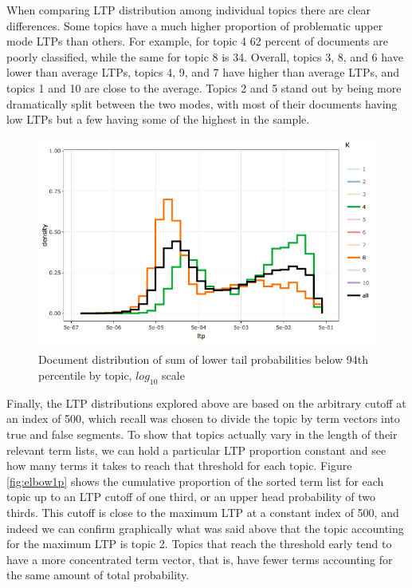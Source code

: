 \documentclass[]{book}
\theoremstyle{definition}
\theoremstyle{definition}
\theoremstyle{definition}
\theoremstyle{remark}
\begin{document}
When comparing LTP distribution among individual topics there are clear
differences. Some topics have a much higher proportion of problematic
upper mode LTPs than others. For example, for topic 4 62 percent of
documents are poorly classified, while the same for topic 8 is 34.
Overall, topics 3, 8, and 6 have lower than average LTPs, topics 4, 9,
and 7 have higher than average LTPs, and topics 1 and 10 are close to
the average. Topics 2 and 5 stand out by being more dramatically split
between the two modes, with most of their documents having low LTPs but
a few having some of the highest in the sample.

\begin{figure}

{\centering \includegraphics[width=0.9\linewidth]{img/k10headtail} 

}

\caption{Document distribution of sum of lower tail probabilities below 94th percentile by topic, $log_{10}$ scale}\label{fig:k10headtailp}
\end{figure}

Finally, the LTP distributions explored above are based on the arbitrary
cutoff at an index of 500, which recall was chosen to divide the topic
by term vectors into true and false segments. To show that topics
actually vary in the length of their relevant term lists, we can hold a
particular LTP proportion constant and see how many terms it takes to
reach that threshold for each topic. Figure \ref{fig:elbow1p} shows the
cumulative proportion of the sorted term list for each topic up to an
LTP cutoff of one third, or an upper head probability of two thirds.
This cutoff is close to the maximum LTP at a constant index of 500, and
indeed we can confirm graphically what was said above that the topic
accounting for the maximum LTP is topic 2. Topics that reach the
threshold early tend to have a more concentrated term vector, that is,
have fewer terms accounting for the same amount of total probability.
\end{document}
